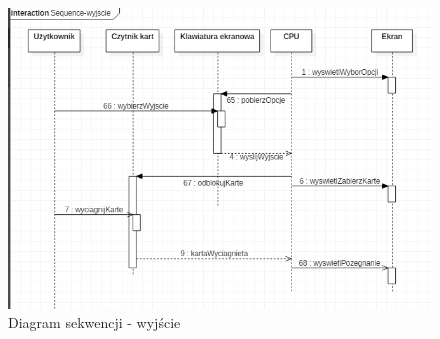\documentclass[a4paper, 11pt]{article}
\begin{document}
	\begin{figure}[H]%
		\includegraphics[scale=0.9]{sequence4.png}\caption{Diagram sekwencji - wyjście}
	\end{figure}
		
	
	
	
	
\end{document}
